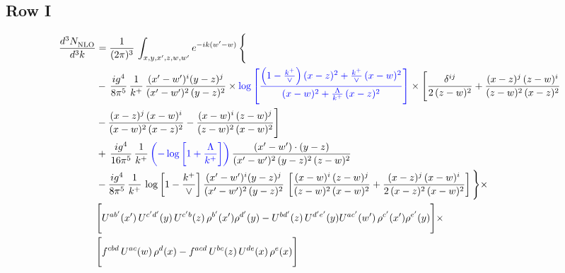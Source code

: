 \documentclass[9pt]{article}
\newcommand{\new}[1]{{\color{blue}#1}}
\numberwithin{equation}{section}
\begin{document}
\subsection{Row I}
\begin{align}
     \frac{d^{3}N_{\rm NLO}^{\rm}}{d^{3}k}  & =  \frac{1}{(2\pi)^{3}}\, \int_{x,y,x',z,w,w^{\prime}} e^{-ik(w^{\prime}-w)}\, \Bigg\{\notag \\ & -\,\frac{ig^{4}}{8\pi^{5}}\,\frac{1}{k^{+}}\,\frac{(x'-w')^{i}(y-z)^{j}}{(x'-w')^{2}\,(y-z)^{2}}\times \new{\log{\left[\frac{\left(1-\frac{k^{+}}{\vee}\right)(x-z)^{2}+\frac{k^{+}}{\vee}\,(x-w)^{2}}{(x-w)^{2}+\frac{\Lambda}{k^{+}}\,(x-z)^{2}}\right]}}\times \Bigg[\frac{\delta^{ij}}{2\,(z-w)^{2}}+\frac{(x-z)^{j}\,(z-w)^{i}}{(z-w)^{2}\,(x-z)^{2}}\notag \\ & -\frac{(x-z)^{j}\,(x-w)^{i}}{(x-w)^{2}\,(x-z)^{2}}-\frac{(x-w)^{i}\,(z-w)^{j}}{(z-w)^{2}\,(x-w)^{2}}\Bigg]\notag \\ & +\,\frac{ig^{4}}{16\pi^{5}}\,\frac{1}{k^{+}}\,\new{\left(-\log{\left[1+\frac{\Lambda}{k^{+}}\right]}\right)}\, \frac{(x'-w')\cdot (y-z)}{(x'-w')^{2}\,(y-z)^{2}\,(z-w)^{2}}\notag \\ & -\frac{ig^{4}}{8\pi^{5}}\,\frac{1}{k^{+}}\, \log{\left[1-\frac{k^{+}}{\vee}\right]}\,\frac{(x'-w')^{i}(y-z)^{j}}{(x'-w')^{2}\,(y-z)^{2}}\,\left[\frac{(x-w)^{i}\,(z-w)^{j}}{(z-w)^{2}\,(x-w)^{2}}+\frac{(x-z)^{j}\,(x-w)^{i}}{2\,(x-z)^{2}\, (x-w)^{2}}\right]\Bigg\}\times \notag \\ &  \Bigg[U^{ab'}(x')\,U^{c'd'}(y)\,U^{c'b}(z)\,\rho^{b'}(x')\rho^{d'}(y)-U^{bd'}(z)\,U^{d'e'}(y)U^{ac'}(w')\,\rho^{c'}(x')\rho^{e'}(y)\Bigg]\times\notag \\ & \Bigg[f^{cbd}\,U^{ac}(w)\,\rho^{d}(x)-f^{acd}\, U^{bc}(z)\,U^{de}(x)\,\rho^{e}(x)\Bigg] 
\end{align}
\end{document}
